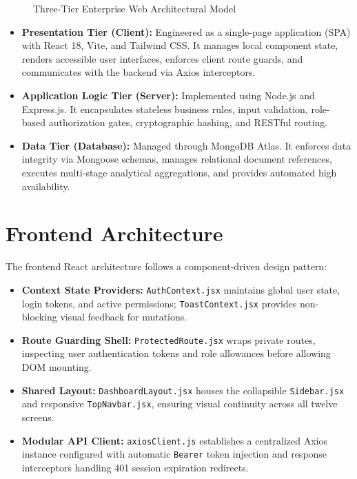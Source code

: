 \begin{figure}[h!]
\caption{Three-Tier Enterprise Web Architectural Model}
\label{fig:three_tier}
\end{figure}

\begin{itemize}
    \item \textbf{Presentation Tier (Client):} Engineered as a single-page application (SPA) with React 18, Vite, and Tailwind CSS. It manages local component state, renders accessible user interfaces, enforces client route guards, and communicates with the backend via Axios interceptors.
    \item \textbf{Application Logic Tier (Server):} Implemented using Node.js and Express.js. It encapsulates stateless business rules, input validation, role-based authorization gates, cryptographic hashing, and RESTful routing.
    \item \textbf{Data Tier (Database):} Managed through MongoDB Atlas. It enforces data integrity via Mongoose schemas, manages relational document references, executes multi-stage analytical aggregations, and provides automated high availability.
\end{itemize}

\section{Frontend Architecture}
The frontend React architecture follows a component-driven design pattern:
\begin{itemize}
    \item \textbf{Context State Providers:} \texttt{AuthContext.jsx} maintains global user state, login tokens, and active permissions; \texttt{ToastContext.jsx} provides non-blocking visual feedback for mutations.
    \item \textbf{Route Guarding Shell:} \texttt{ProtectedRoute.jsx} wraps private routes, inspecting user authentication tokens and role allowances before allowing DOM mounting.
    \item \textbf{Shared Layout:} \texttt{DashboardLayout.jsx} houses the collapsible \texttt{Sidebar.jsx} and responsive \texttt{TopNavbar.jsx}, ensuring visual continuity across all twelve screens.
    \item \textbf{Modular API Client:} \texttt{axiosClient.js} establishes a centralized Axios instance configured with automatic \texttt{Bearer} token injection and response interceptors handling 401 session expiration redirects.
\end{itemize}

